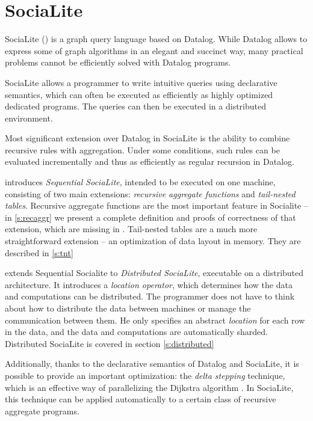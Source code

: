 
\chapter{SociaLite}\label{r:socialite}


SociaLite (\cite{socialite, distsoc}) is a graph query language based on Datalog. While Datalog allows to express some of graph algorithms
in an elegant and succinct way, many practical problems cannot be efficiently solved with Datalog programs. 

SociaLite allows a programmer to write intuitive queries using declarative semantics, which can often be executed as efficiently as highly optimized dedicated programs. The queries can then be executed in a distributed environment.

Most significant extension over Datalog in SociaLite is the ability to combine recursive rules with aggregation. Under some conditions, such rules can be evaluated incrementally and thus as efficiently as regular recursion in Datalog.

\cite{socialite} introduces \emph{Sequential SociaLite}, intended to be executed on one machine, consisting of two main extensions: \emph{recursive aggregate functions} and \emph{tail-nested tables}. Recursive aggregate functions are the most important feature in Socialite -- in \ref{s:recaggr} we present a complete definition and proofs of correctness of that extension, which are missing in \cite{socialite}. Tail-nested tables are a much more straightforward extension -- an optimization of data layout in memory. They are described in \ref{s:tnt}

\cite{distsoc} extends Sequential Socialite to \emph{Distributed SociaLite}, executable on a distributed architecture. It introduces a \emph{location operator}, which determines how the data and computations can be distributed. The programmer does not have to think about how to distribute the data between machines or manage the communication between them. He only specifies an abstract \emph{location} for each row in the data, and the data and computations are automatically sharded. Distributed SociaLite is covered in section \ref{s:distributed}

Additionally, thanks to the declarative semantics of Datalog and SociaLite, it is possible to provide an important optimization: the \emph{delta stepping} technique, which is an effective way of parallelizing the Dijkstra algorithm \cite{deltastep}. In SociaLite, this technique can be applied automatically to a certain class of recursive aggregate programs. 

